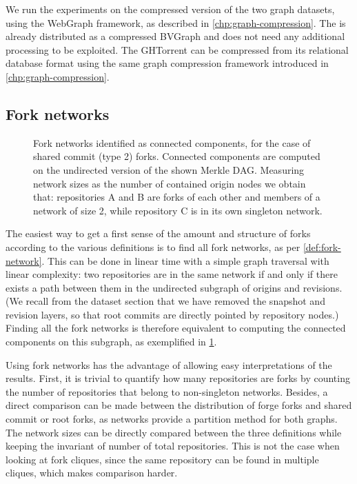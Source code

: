 We run the experiments on the compressed version of the two graph datasets,
using the WebGraph framework, as described in \cref{chp:graph-compression}.
The \SWHGD{} is already distributed as a compressed BVGraph and does not need
any additional processing to be exploited.
The GHTorrent can be compressed from its relational
database format using the same graph compression framework introduced in
\cref{chp:graph-compression}.

\subsection{Fork networks}%
\label{sec:methodology-fork-networks}

\begin{figure}[t]
  \centering
  
  \caption{Fork networks identified as connected components, for the case of
    shared commit (type 2) forks. Connected components are computed on the
    undirected version of the shown Merkle DAG\@. Measuring network sizes as
    the number of contained origin nodes we obtain that: repositories A and B
    are forks of each other and members of a network of size 2, while
    repository C is in its own singleton network.}%
  \label{fig:fork-clusters}
\end{figure}

The easiest way to get a first sense of the amount and structure of forks
according to the various definitions is to find all fork networks, as per
\cref{def:fork-network}. This can be done in linear time with a
simple graph traversal with linear complexity: two repositories are in the same
network if and only if there exists a path between them in the undirected
subgraph of origins and revisions. (We recall from the dataset section that we
have removed the snapshot and revision layers, so that root commits are
directly pointed by repository nodes.) Finding all the fork networks is
therefore equivalent to computing the connected components on this subgraph, as
exemplified in \cref{fig:fork-clusters}.

Using fork networks has the advantage of allowing easy interpretations of the
results. First, it is trivial to quantify how many repositories are forks by
counting the number of repositories that belong to non-singleton networks.
Besides, a direct comparison can be made between the distribution of forge
forks and shared commit or root forks, as networks provide a partition method
for both graphs. The network sizes can be directly compared between the three
definitions while keeping the invariant of number of total repositories.
This is not the case when looking at fork cliques, since the same repository
can be found in multiple cliques, which makes comparison harder.

